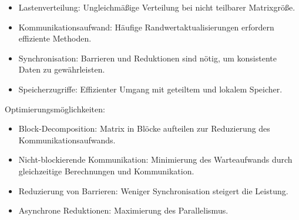 \documentclass[a4paper,12pt]{article}
\begin{document}
\begin{itemize}
    \item Lastenverteilung: Ungleichmäßige Verteilung bei nicht teilbarer Matrixgröße.
    \item Kommunikationsaufwand: Häufige Randwertaktualisierungen erfordern effiziente Methoden.
    \item Synchronisation: Barrieren und Reduktionen sind nötig, um konsistente Daten zu gewährleisten.
    \item Speicherzugriffe: Effizienter Umgang mit geteiltem und lokalem Speicher.
\end{itemize}

Optimierungsmöglichkeiten:

\begin{itemize}
    \item Block-Decomposition: Matrix in Blöcke aufteilen zur Reduzierung des Kommunikationsaufwands.
    \item Nicht-blockierende Kommunikation: Minimierung des Warteaufwands durch gleichzeitige Berechnungen und Kommunikation.
    \item Reduzierung von Barrieren: Weniger Synchronisation steigert die Leistung.
    \item Asynchrone Reduktionen: Maximierung des Parallelismus.
\end{itemize}
\end{document}
